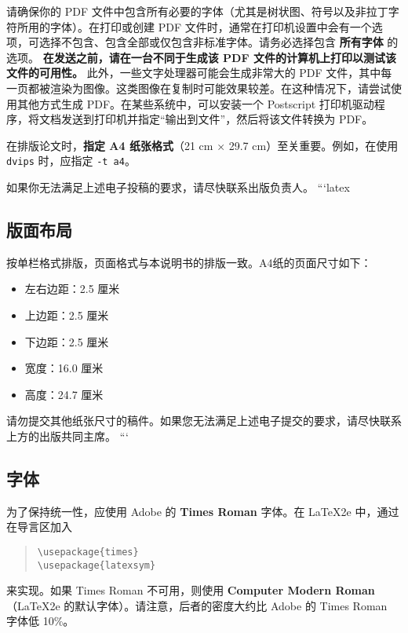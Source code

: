 \documentclass[11pt]{article}
\begin{document}
请确保你的 PDF 文件中包含所有必要的字体（尤其是树状图、符号以及非拉丁字符所用的字体）。在打印或创建 PDF 文件时，通常在打印机设置中会有一个选项，可选择不包含、包含全部或仅包含非标准字体。请务必选择包含 \textbf{所有字体} 的选项。 \textbf{在发送之前，请在一台不同于生成该 PDF 文件的计算机上打印以测试该文件的可用性。} 此外，一些文字处理器可能会生成非常大的 PDF 文件，其中每一页都被渲染为图像。这类图像在复制时可能效果较差。在这种情况下，请尝试使用其他方式生成 PDF。在某些系统中，可以安装一个 Postscript 打印机驱动程序，将文档发送到打印机并指定“输出到文件”，然后将该文件转换为 PDF。

在排版论文时，\textbf{指定 A4 纸张格式}（21 cm × 29.7 cm）至关重要。例如，在使用 {\tt dvips} 时，应指定 {\tt -t a4}。

如果你无法满足上述电子投稿的要求，请尽快联系出版负责人。
```latex
\subsection{版面布局}
\label{ssec:layout}

按单栏格式排版，页面格式与本说明书的排版一致。A4纸的页面尺寸如下：

\begin{itemize}
\item 左右边距：2.5 厘米
\item 上边距：2.5 厘米
\item 下边距：2.5 厘米
\item 宽度：16.0 厘米
\item 高度：24.7 厘米
\end{itemize}

\noindent 请勿提交其他纸张尺寸的稿件。如果您无法满足上述电子提交的要求，请尽快联系上方的出版共同主席。
```
\subsection{字体}

为了保持统一性，应使用 Adobe 的 {\bf Times Roman} 字体。在 \LaTeX2e{} 中，通过在导言区加入

\begin{quote}
\begin{verbatim}
\usepackage{times}
\usepackage{latexsym}
\end{verbatim}
\end{quote}
来实现。如果 Times Roman 不可用，则使用 {\bf Computer Modern Roman}（\LaTeX2e{} 的默认字体）。请注意，后者的密度大约比 Adobe 的 Times Roman 字体低 10\%。 
\end{document}
